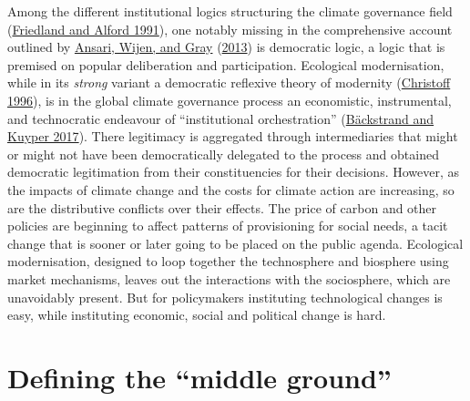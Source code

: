 \documentclass[a4paper, nobind]{templates/ociamthesis}
\begin{document}
Among the different institutional logics structuring the climate governance field (\protect\hyperlink{ref-friedland_bringing_1991}{Friedland and Alford 1991}), one notably missing in the comprehensive account outlined by \protect\hyperlink{ref-ansari_constructing_2013}{Ansari, Wijen, and Gray} (\protect\hyperlink{ref-ansari_constructing_2013}{2013}) is democratic logic, a logic that is premised on popular deliberation and participation. Ecological modernisation, while in its \emph{strong} variant a democratic reflexive theory of modernity (\protect\hyperlink{ref-christoff_ecological_1996}{Christoff 1996}), is in the global climate governance process an economistic, instrumental, and technocratic endeavour of ``institutional orchestration'' (\protect\hyperlink{ref-backstrand_democratic_2017}{Bäckstrand and Kuyper 2017}). There legitimacy is aggregated through intermediaries that might or might not have been democratically delegated to the process and obtained democratic legitimation from their constituencies for their decisions. However, as the impacts of climate change and the costs for climate action are increasing, so are the distributive conflicts over their effects. The price of carbon and other policies are beginning to affect patterns of provisioning for social needs, a tacit change that is sooner or later going to be placed on the public agenda. Ecological modernisation, designed to loop together the technosphere and biosphere using market mechanisms, leaves out the interactions with the sociosphere, which are unavoidably present. But for policymakers instituting technological changes is easy, while instituting economic, social and political change is hard.

\hypertarget{defining-the-middle-ground}{%
\section{Defining the ``middle ground''}\label{defining-the-middle-ground}}
\end{document}

